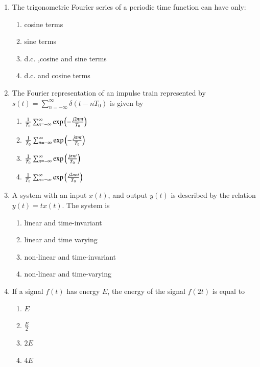 \renewcommand{\theequation}{\theenumi}
\begin{enumerate}[label=\arabic*.,ref=\theenumi]

\item The trigonometric Fourier series of a periodic time function can have only:
\begin{enumerate}[label=(\Alph*)]
\item cosine terms 
\item sine terms
\item d.c. ,cosine and sine terms
\item d.c. and cosine terms 
\end{enumerate}
\solution


\item The Fourier representation of an impulse train represented by $s(t) = \sum_{n=-\infty}^{\infty}\delta(t-nT_0)$ is given by
\begin{enumerate}[label=(\alph*)]
\setlength\itemsep{0.5em}
    \item $\frac{1}{T_0}\sum_{n=-\infty}^{\infty}\exp\left(-\frac{j2\pi nt}{T_0}\right)$
    \item $\frac{1}{T_0}\sum_{n=-\infty}^{\infty}\exp\left(-\frac{j\pi nt}{T_0}\right)$
    \item $\frac{1}{T_0}\sum_{n=-\infty}^{\infty}\exp\left(\frac{j\pi nt}{T_0}\right)$
    \item $\frac{1}{T_0}\sum_{n=-\infty}^{\infty}\exp\left(\frac{j2\pi nt}{T_0}\right)$
\end{enumerate}
\solution

%
\item A system with an input $x(t)$, and output $y(t)$ is described by the relation $y(t) = tx(t)$. The system is
\begin{enumerate}
    \item  linear and time-invariant  
    \item linear and time varying   
  \item non-linear and time-invariant  
  \item non-linear and time-varying 
\end{enumerate}

%

\item If a signal $f(t)$ has energy $E$, the energy of the signal $f(2t)$ is equal to 
\begin{enumerate}[label=\Alph*)]
    \item $E$
    \item $\frac{E}{2}$
    \item $2E$
    \item $4E$
\end{enumerate}
\solution

%



\end{enumerate}

